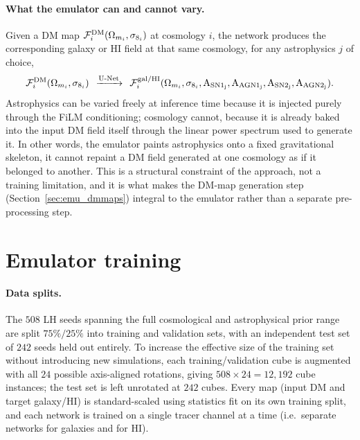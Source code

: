 \paragraph{What the emulator can and cannot vary.}
Given a DM map $\mathcal{F}^{\rm DM}_{i}(\Omega_{m_i}, \sigma_{8_i})$ at cosmology $i$, the
network produces the corresponding galaxy or HI field at that same
cosmology, for any astrophysics $j$ of choice,
\begin{equation}
    \mathcal{F}^{\rm DM}_{i}(\Omega_{m_i}, \sigma_{8_i}) \:\: \xrightarrow[]{\text{U-Net}} \:\: \mathcal{F}^{\rm gal/HI}_{i}(\Omega_{m_i}, \sigma_{8_i}, {\rm A_{SN1_{j}},A_{AGN1_{j}},A_{SN2_{j}},A_{AGN2_{j}}}).
\end{equation}
Astrophysics can be varied freely at inference time because it is injected
purely through the FiLM conditioning; cosmology cannot, because it is
already baked into the input DM field itself through the linear power
spectrum used to generate it. In other words, the emulator paints
astrophysics onto a fixed gravitational skeleton, it cannot repaint a DM
field generated at one cosmology as if it belonged to another. This is a
structural constraint of the approach, not a training limitation, and it is
what makes the DM-map generation step (Section~\ref{sec:emu_dmmaps})
integral to the emulator rather than a separate pre-processing step.

\section{Emulator training}
\label{sec:emu_train}

\paragraph{Data splits.}
The $508$ \CAMELS LH seeds spanning the full cosmological and astrophysical
prior range are split $75\%/25\%$ into training and validation sets, with an
independent test set of $242$ seeds held out entirely. To increase the
effective size of the training set without introducing new simulations, each
training/validation cube is augmented with all $24$ possible axis-aligned
rotations, giving $508 \times 24 = 12{,}192$ cube instances; the test set is
left unrotated at $242$ cubes. Every map (input DM and target galaxy/HI) is
standard-scaled using statistics fit on its own training split, and each
network is trained on a single tracer channel at a time (i.e.\ separate
networks for galaxies and for HI).


